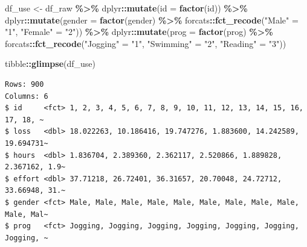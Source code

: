 \documentclass[
]{article}
\newenvironment{Shaded}{\begin{snugshade}}{\end{snugshade}}
\newcommand{\AttributeTok}[1]{\textcolor[rgb]{0.13,0.29,0.53}{#1}}
\newcommand{\FunctionTok}[1]{\textcolor[rgb]{0.13,0.29,0.53}{\textbf{#1}}}
\newcommand{\NormalTok}[1]{#1}
\newcommand{\OtherTok}[1]{\textcolor[rgb]{0.56,0.35,0.01}{#1}}
\newcommand{\SpecialCharTok}[1]{\textcolor[rgb]{0.81,0.36,0.00}{\textbf{#1}}}
\newcommand{\StringTok}[1]{\textcolor[rgb]{0.31,0.60,0.02}{#1}}
\begin{document}
\begin{Shaded}
\begin{Highlighting}[]
\NormalTok{df\_use }\OtherTok{\textless{}{-}}\NormalTok{ df\_raw }\SpecialCharTok{\%\textgreater{}\%} 
\NormalTok{  dplyr}\SpecialCharTok{::}\FunctionTok{mutate}\NormalTok{(}\AttributeTok{id =} \FunctionTok{factor}\NormalTok{(id)) }\SpecialCharTok{\%\textgreater{}\%} 
\NormalTok{  dplyr}\SpecialCharTok{::}\FunctionTok{mutate}\NormalTok{(}\AttributeTok{gender =} \FunctionTok{factor}\NormalTok{(gender) }\SpecialCharTok{\%\textgreater{}\%} 
\NormalTok{                  forcats}\SpecialCharTok{::}\FunctionTok{fct\_recode}\NormalTok{(}\StringTok{"Male"}   \OtherTok{=} \StringTok{"1"}\NormalTok{,}
                                      \StringTok{"Female"} \OtherTok{=} \StringTok{"2"}\NormalTok{)) }\SpecialCharTok{\%\textgreater{}\%} 
\NormalTok{  dplyr}\SpecialCharTok{::}\FunctionTok{mutate}\NormalTok{(}\AttributeTok{prog =} \FunctionTok{factor}\NormalTok{(prog) }\SpecialCharTok{\%\textgreater{}\%} 
\NormalTok{                  forcats}\SpecialCharTok{::}\FunctionTok{fct\_recode}\NormalTok{(}\StringTok{"Jogging"}  \OtherTok{=} \StringTok{"1"}\NormalTok{,}
                                      \StringTok{"Swimming"} \OtherTok{=} \StringTok{"2"}\NormalTok{,}
                                      \StringTok{"Reading"} \OtherTok{=} \StringTok{"3"}\NormalTok{))}
\end{Highlighting}
\end{Shaded}

\begin{Shaded}
\begin{Highlighting}[]
\NormalTok{tibble}\SpecialCharTok{::}\FunctionTok{glimpse}\NormalTok{(df\_use)}
\end{Highlighting}
\end{Shaded}

\begin{verbatim}
Rows: 900
Columns: 6
$ id     <fct> 1, 2, 3, 4, 5, 6, 7, 8, 9, 10, 11, 12, 13, 14, 15, 16, 17, 18, ~
$ loss   <dbl> 18.022263, 10.186416, 19.747276, 1.883600, 14.242589, 19.694731~
$ hours  <dbl> 1.836704, 2.389360, 2.362117, 2.520866, 1.889828, 2.367162, 1.9~
$ effort <dbl> 37.71218, 26.72401, 36.31657, 20.70048, 24.72712, 33.66948, 31.~
$ gender <fct> Male, Male, Male, Male, Male, Male, Male, Male, Male, Male, Mal~
$ prog   <fct> Jogging, Jogging, Jogging, Jogging, Jogging, Jogging, Jogging, ~
\end{verbatim}

\clearpage
\end{document}
